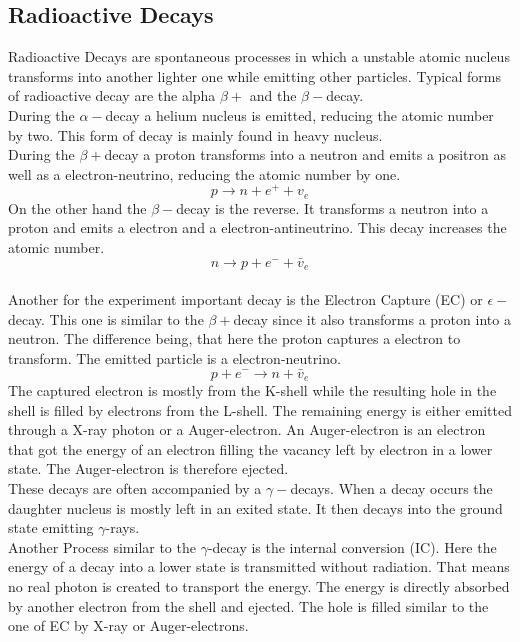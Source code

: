 \documentclass[30pt,a4paper]{article}
\begin{document}
	\subsection{Radioactive Decays}
	Radioactive Decays are spontaneous processes in which a unstable atomic nucleus transforms into another lighter one while emitting other particles. Typical forms of radioactive decay are the alpha $\beta+$ and the $\beta-$decay.\\
	During the $\alpha-$decay a helium nucleus is emitted, reducing the atomic number by two. This form of decay is mainly found in heavy nucleus.\\ During the $\beta+$decay a proton transforms into a neutron and emits a positron as well as a electron-neutrino, reducing the atomic number by one.
	$$p\rightarrow n+e^++v_e$$
	On the other hand the $\beta-$decay is the reverse. It transforms a neutron into a proton and emits a electron and a electron-antineutrino. This decay increases the atomic number.
	$$n\rightarrow p+e^-+\bar{v}_e$$\\
	Another for the experiment important decay is the Electron Capture (EC) or $\epsilon-$decay. This one is similar to the $\beta+$decay since it also transforms a proton into a neutron. The difference being, that here the proton captures a electron to transform. The emitted particle is a electron-neutrino.
	$$p + e^- \rightarrow n + \bar{v}_e$$
	The captured electron is mostly from the K-shell while the resulting hole in the shell is filled by electrons from the L-shell. The remaining energy is either emitted through a X-ray photon or a Auger-electron. An Auger-electron is an electron that got the energy of an electron filling the vacancy left by electron in a lower state. The Auger-electron is therefore ejected. \\
	These decays are often accompanied by a $\gamma-$decays. When a decay occurs the daughter nucleus is mostly left in an exited state. It then decays into the ground state emitting $\gamma$-rays.\\
	Another Process similar to the $\gamma$-decay is the internal conversion (IC). Here the energy of a decay into a lower state is transmitted without radiation. That means no real photon is created to transport the energy. The energy is directly absorbed by another electron from the shell and ejected. The hole is filled similar to the one of EC by X-ray or Auger-electrons. 
\end{document}
